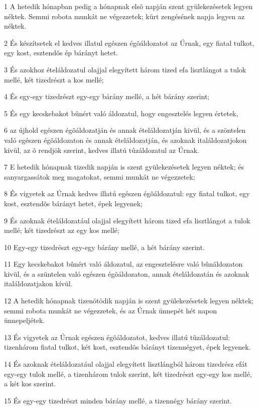 \par 1 A hetedik hónapban pedig a hónapnak elsõ napján szent gyülekezésetek legyen néktek. Semmi robota munkát ne végezzetek; kürt zengésének napja legyen az néktek.
\par 2 És készítsetek el kedves illatul egészen égõáldozatot az Úrnak, egy fiatal tulkot, egy kost, esztendõs ép bárányt hetet.
\par 3 És azokhoz ételáldozatul olajjal elegyített három tized efa lisztlángot a tulok mellé, két tizedrészt a kos mellé;
\par 4 És egy-egy tizedrészt egy-egy bárány mellé, a hét bárány szerint;
\par 5 És egy kecskebakot bûnért való áldozatul, hogy engesztelés legyen értetek,
\par 6 az újhold egészen égõáldozatján és annak ételáldozatján kivül, és a szöntelen való egészen égõáldozaton és annak ételáldozatján, és azoknak italáldozatjokon kivül, az õ rendjök szerint, kedves illatú tûzáldozatul az Úrnak.
\par 7 E hetedik hónapnak tizedik napján is szent gyülekezésetek legyen néktek; és sanyargassátok meg magatokat, semmi munkát ne végezzetek;
\par 8 És vigyetek az Úrnak kedves illatú egészen égõáldozatul: egy fiatal tulkot, egy kost, esztendõs bárányt hetet, épek legyenek;
\par 9 És azoknak ételáldozatául olajjal elegyített három tized efa lisztlángot a tulok mellé; két tizedrészt az egy kos mellé;
\par 10 Egy-egy tizedrészt egy-egy bárány mellé, a hét bárány szerint.
\par 11 Egy kecskebakot bûnért való áldozatul, az engesztelésre való bûnáldozaton kivül, és a szüntelen való egészen égõáldozaton, annak ételáldozatán és azoknak italáldozatjakon kívül.
\par 12 A hetedik hónapnak tizenötödik napján is szent gyülekezésetek legyen néktek; semmi robota munkát ne végezzetek, és az Úrnak ünnepét hét napon ünnepeljétek.
\par 13 És vigyetek az Úrnak egészen égõáldozatot, kedves illatú tûzáldozatul: tizenhárom fiatal tulkot, két kost, esztendõs bárányt tizennégyet, épek legyenek.
\par 14 És azoknak ételáldozatául olajjal elegyített lisztlángból három tizedrész efát egy-egy tulok mellé, a tizenhárom tulok szerint, két tizedrészt egy-egy kos mellé, a két kos szerint.
\par 15 És egy-egy tizedrészt minden bárány mellé, a tizennégy bárány szerint.
